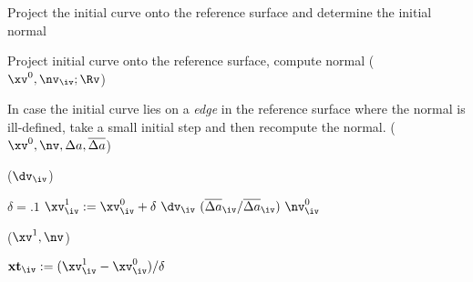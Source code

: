 \begin{algorithm}
\caption{Project the initial curve onto the reference surface and determine the initial normal}
\begin{algorithmic}[1]
    \State Project initial curve onto the reference surface, compute normal
    \State {}($\xv^0, \nv_\iv; \Rv$)

    \State In case the initial curve lies on a {\em edge} in the reference surface where
    \State the normal is ill-defined, take a small initial step and then recompute the normal.
    \State {}($\xv^0, \nv, \da, \das$)

    \State {}($\dv_\iv$)  

    \State  $\delta = .1$  
    \State $\xv^1_\iv := \xv^0_\iv + \delta~\dv_\iv~({\das_\iv / \das_\iv})~\nv^0_\iv$   

    \State {}($\xv^1, \nv$)  

    \State $\xt_\iv := (\xv^1_\iv-\xv^0_\iv)/\delta$  
\EndFunction
\end{algorithmic}
\end{algorithm}




